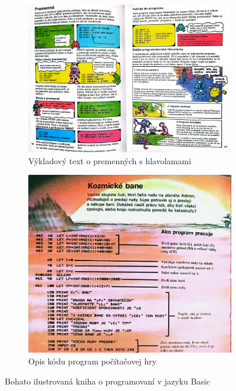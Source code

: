 \begin{figure}[h]
\centering
\begin{subfigure}[b]{0.55\textwidth}
\centering
\includegraphics[width=\textwidth]{assets/kniha-premenne.jpg}
\caption{Výkladový text o premenných s hlavolamami}
\label{fig:skusis-prog-premenne}
\end{subfigure}
\hfill
\begin{subfigure}[b]{0.44\textwidth}
\centering
\includegraphics[width=\textwidth]{assets/program-kozmicke-bane.jpg}
\caption{Opis kódu program počítačovej hry}
\label{fig:skusis-prog-kozmicke-bane}
\end{subfigure}
\caption{Bohato ilustrovaná kniha o programovaní v jazyku Basic}
\end{figure}

